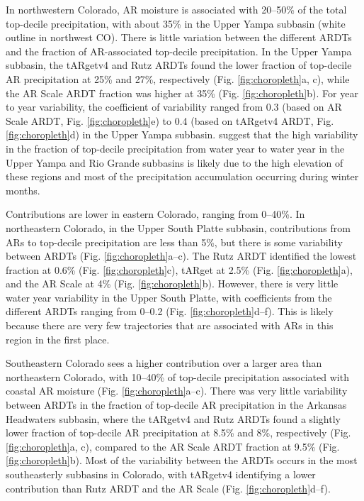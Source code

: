 \documentclass[draft]{agujournal2019}
\begin{document}
In northwestern Colorado, AR moisture is associated with 20--50\% of the total top-decile precipitation, with about 35\% in the Upper Yampa subbasin (white outline in northwest CO). There is little variation between the different ARDTs and the fraction of AR-associated top-decile precipitation. In the Upper Yampa subbasin, the tARgetv4 and Rutz ARDTs found the lower fraction of top-decile AR precipitation at 25\% and 27\%, respectively (Fig. \ref{fig:choropleth}a, c), while the AR Scale ARDT fraction was higher at 35\% (Fig. \ref{fig:choropleth}b). For year to year variability, the coefficient of variability ranged from 0.3 (based on AR Scale ARDT, Fig. \ref{fig:choropleth}e) to 0.4 (based on tARgetv4 ARDT, Fig. \ref{fig:choropleth}d) in the Upper Yampa subbasin.  suggest that the high variability in the fraction of top-decile precipitation from water year to water year in the Upper Yampa and Rio Grande subbasins is likely due to the high elevation of these regions and most of the precipitation accumulation occurring during winter months. 

Contributions are lower in eastern Colorado, ranging from 0--40\%. In northeastern Colorado, in the Upper South Platte subbasin, contributions from ARs to top-decile precipitation are less than 5\%, but there is some variability between ARDTs (Fig. \ref{fig:choropleth}a--c). The Rutz ARDT identified the lowest fraction at 0.6\% (Fig. \ref{fig:choropleth}c), tARget at 2.5\% (Fig. \ref{fig:choropleth}a), and the AR Scale at 4\% (Fig. \ref{fig:choropleth}b). However, there is very little water year variability in the Upper South Platte, with coefficients from the different ARDTs ranging from 0--0.2 (Fig. \ref{fig:choropleth}d--f). This is likely because there are very few trajectories that are associated with ARs in this region in the first place. 

Southeastern Colorado sees a higher contribution over a larger area than northeastern Colorado, with 10--40\% of top-decile precipitation associated with coastal AR moisture (Fig. \ref{fig:choropleth}a--c). There was very little variability between ARDTs in the fraction of top-decile AR precipitation in the Arkansas Headwaters subbasin, where the tARgetv4 and Rutz ARDTs found a slightly lower fraction of top-decile AR precipitation at 8.5\% and 8\%, respectively (Fig. \ref{fig:choropleth}a, c), compared to the AR Scale ARDT fraction at 9.5\% (Fig. \ref{fig:choropleth}b). Most of the variability between the ARDTs occurs in the most southeasterly subbasins in Colorado, with tARgetv4 identifying a lower contribution than Rutz ARDT and the AR Scale (Fig. \ref{fig:choropleth}d--f).
\end{document}
